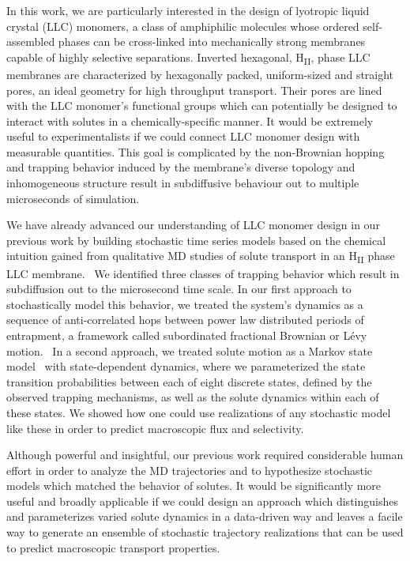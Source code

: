 \documentclass[journal=jpcbfk,manuscript=article]{achemso}
\begin{document}
  In this work, we are particularly interested in the design of lyotropic liquid 
  crystal (LLC) monomers, a class of amphiphilic molecules whose ordered self-assembled
  phases can be cross-linked into mechanically strong membranes capable of highly 
  selective separations. Inverted hexagonal, H\textsubscript{II}, phase LLC membranes
  are characterized	by hexagonally packed, uniform-sized and straight pores, an ideal
  geometry for high throughput transport. Their pores are lined with the LLC monomer's
  functional groups which can potentially be designed to interact with solutes in a 
  chemically-specific manner. It would be extremely useful to experimentalists if we 
  could connect LLC monomer design with measurable quantities. This goal is complicated
  by the non-Brownian hopping and trapping behavior induced by the membrane's diverse
  topology and inhomogeneous structure result in subdiffusive behaviour out to multiple microseconds of simulation.~\cite{coscia_understanding_2019,coscia_chemically_2019}

  We have already advanced our understanding of LLC monomer design in our previous work
  by building stochastic time series models based on the chemical intuition gained
  from qualitative MD studies of solute transport in an H\textsubscript{II} phase LLC
  membrane.~\cite{coscia_chemically_2019,coscia_capturing_2020} We identified three 
  classes of trapping behavior which result in 
  subdiffusion out to the microsecond time scale. 
  In our 
  first approach to stochastically model this behavior, we treated the system's dynamics
  as a sequence of anti-correlated hops between power law distributed periods of 
  entrapment, a framework called subordinated fractional Brownian or L\'evy
  motion.~\cite{thiel_weak_2014,teuerle_modeling_2013} In a second approach, we treated 
  solute motion as a Markov state model~\cite{pande_everything_2010} with state-dependent
  dynamics, where we parameterized the state transition probabilities between each of
  eight discrete states, defined by the observed trapping mechanisms, as well as the 
  solute dynamics within each of these states. We showed how one could use realizations
  of any stochastic model like these in order to predict macroscopic flux and selectivity. 
  
  Although powerful and insightful, our previous work required considerable human effort
  in order to analyze the MD trajectories and to hypothesize stochastic models which
  matched the behavior of solutes. It would be significantly more useful and broadly 
  applicable if we could design an approach which 
  distinguishes and 
  parameterizes varied solute dynamics 
  in a data-driven way
  and leaves a facile way to generate an ensemble
  of stochastic trajectory realizations that can be used to predict macroscopic transport
  properties.
  
\end{document}
